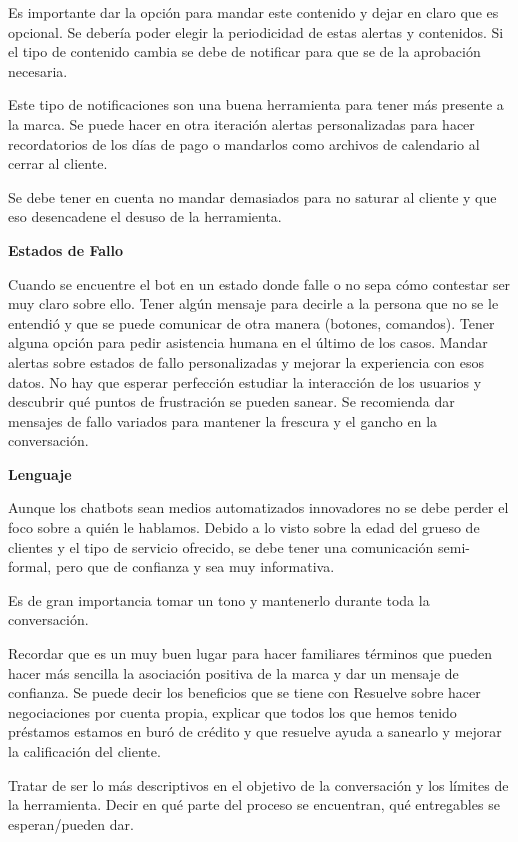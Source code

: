 Es importante dar la opción para mandar este contenido y dejar en claro que es opcional. Se debería poder elegir la periodicidad de estas alertas y contenidos.
Si el tipo de contenido cambia se debe de notificar para que se de la aprobación necesaria.

Este tipo de notificaciones son una buena herramienta para tener más presente a la marca. Se puede hacer en otra iteración alertas personalizadas para hacer recordatorios de los días de pago o mandarlos como archivos de calendario al cerrar al cliente.

Se debe tener en cuenta no mandar demasiados para no saturar al cliente y que eso desencadene el desuso de la herramienta.

\textbf{Estados de Fallo}

Cuando se encuentre el bot en un estado donde falle o no sepa cómo contestar ser muy claro sobre ello. Tener algún mensaje para decirle a la persona que no se le entendió y que se puede comunicar de otra manera (botones, comandos).
Tener alguna opción para pedir asistencia humana en el último de los casos.
Mandar alertas sobre estados de fallo personalizadas y mejorar la experiencia con esos datos.
No hay que esperar perfección estudiar la interacción de los usuarios y descubrir qué puntos de frustración se pueden sanear.
Se recomienda dar mensajes de fallo variados para mantener la frescura y el gancho en la conversación.

\textbf{Lenguaje}

Aunque los chatbots sean medios automatizados innovadores no se debe perder el foco sobre a quién le hablamos. Debido a lo visto sobre la edad del grueso de clientes y el tipo de servicio ofrecido, se debe tener una comunicación semi-formal, pero que de confianza y sea muy informativa.

Es de gran importancia tomar un tono y mantenerlo durante toda la conversación.

Recordar que es un muy buen lugar para hacer familiares términos que pueden hacer más sencilla la asociación positiva de la marca y dar un mensaje de confianza. Se puede decir los beneficios que se tiene con Resuelve sobre hacer negociaciones por cuenta propia, explicar que todos los que hemos tenido préstamos estamos en buró de crédito y que resuelve ayuda a sanearlo y mejorar la calificación del cliente.

Tratar de ser lo más descriptivos en el objetivo de la conversación y los límites de la herramienta. Decir en qué parte del proceso se encuentran, qué entregables se esperan/pueden dar.

